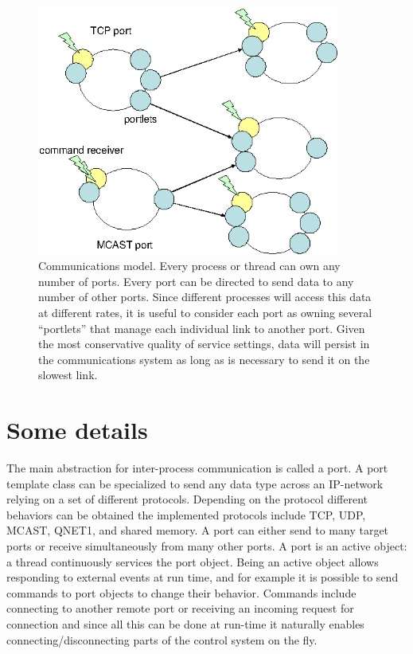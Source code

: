 
\begin{figure}[tb]
\centerline{
\includegraphics[width=10cm]{fig-port-portlets}
}
\caption[Interprocess communication model]{ 
%
Communications model.  Every process or thread can own
any number of ports.  Every port can be directed to send
data to any number of other ports.  Since different
processes will access this data at different rates,
it is useful to consider each port as owning several
``portlets'' that manage each individual link to another
port.  Given the most conservative quality of service settings,
data will persist in the communications system 
as long as is necessary to send it on the slowest link.
%
}
\label{fig:yarp-port}
\end{figure}

\section{Some details}

The main abstraction for inter-process communication is called a
port. A port template class can be specialized to send any data type
across an IP-network relying on a set of different
protocols. Depending on the protocol different behaviors can be
obtained the implemented protocols include TCP, UDP, MCAST, QNET1, and
shared memory. A port can either send to many target ports or receive
simultaneously from many other ports. A port is an active object: a
thread continuously services the port object. Being an active object
allows responding to external events at run time, and for example it
is possible to send commands to port objects to change their
behavior. Commands include connecting to another remote port or
receiving an incoming request for connection and since all this can be
done at run-time it naturally enables connecting/disconnecting parts
of the control system on the fly.



